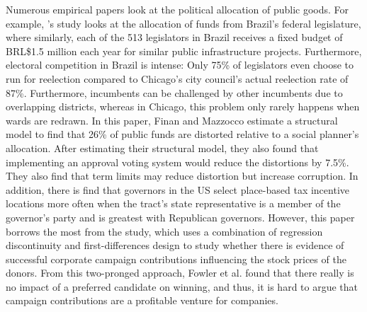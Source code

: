 Numerous empirical papers look at the political allocation of public goods.
For example, \cite{finan2021electoral}'s study looks at the allocation of funds from Brazil's federal legislature, where similarly, each of the 513 legislators in Brazil receives a fixed budget of BRL\$1.5 million each year for similar public infrastructure projects.  
Furthermore, electoral competition in Brazil is intense: Only 75\% of legislators even choose to run for reelection compared to Chicago's city council's actual reelection rate of 87\%.
Furthermore, incumbents can be challenged by other incumbents due to overlapping districts, whereas in Chicago, this problem only rarely happens when wards are redrawn.
In this paper, Finan and Mazzocco estimate a structural model to find that 26\% of public funds are distorted relative to a social planner's allocation. 
After estimating their structural model, they also found that implementing an approval voting system would reduce the distortions by 7.5\%. 
They also find that term limits may reduce distortion but increase corruption.
In addition, there is \cite{frank_hoopes_lester_2022} find that governors in the US select place-based tax incentive locations more often when the tract's state representative is a member of the governor's party and is greatest with Republican governors.
However, this paper borrows the most from the \cite{fowleretalquidproquo} study, which uses a combination of regression discontinuity and first-differences design to study whether there is evidence of successful corporate campaign contributions influencing the stock prices of the donors. 
From this two-pronged approach, Fowler et al. found that there really is no impact of a preferred candidate on winning, and thus, it is hard to argue that campaign contributions are a profitable venture for companies. 

